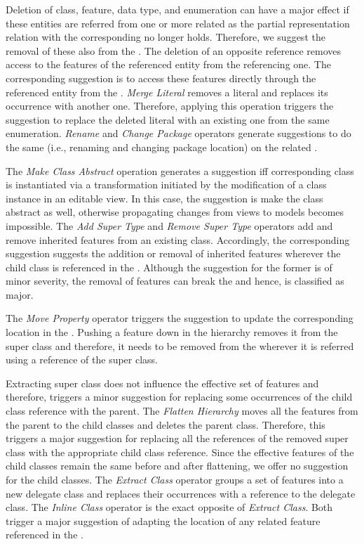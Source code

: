 Deletion of class, feature, data type, and enumeration can have a major effect if these entities are referred from one or more related \viewtypes as the partial representation relation with the corresponding \metamodel no longer holds. Therefore, we suggest the removal of these also from the \viewtypes. The deletion of an opposite reference removes access to the features of the referenced entity from the referencing one. The corresponding suggestion is to access these features directly through the referenced entity from the \viewtype. \textit{Merge Literal} removes a literal and replaces its occurrence with another one. Therefore, applying this operation triggers the suggestion to replace the deleted literal with an existing one from the same enumeration. \textit{Rename} and \textit{Change Package} operators generate suggestions to do the same (i.e., renaming and changing package location) on the related \viewtypes.

The \textit{Make Class Abstract} operation generates a suggestion iff corresponding \metamodel class is instantiated via a transformation initiated by the modification of a class instance in an editable view. In this case, the suggestion is make the \viewtype class abstract as well, otherwise propagating changes from views to models becomes impossible. The \textit{Add Super Type} and \textit{Remove Super Type} operators add and remove inherited features from an existing class. Accordingly, the corresponding suggestion suggests the addition or removal of inherited features wherever the child class is referenced in the \viewtype. Although the suggestion for the former is of minor severity, the removal of features can break the \viewtype and hence, is classified as major.

The \textit{Move Property} operator triggers the suggestion to update the corresponding location in the \viewtype. Pushing a feature down in the hierarchy removes it from the super class and therefore, it needs to be removed from the \viewtype wherever it is referred using a reference of the super class.

Extracting super class does not influence the effective set of features and therefore, triggers a minor suggestion for replacing some occurrences of the child class reference with the parent. The \textit{Flatten Hierarchy} moves all the features from the parent to the child classes and deletes the parent class. Therefore, this triggers a major suggestion for replacing all the references of the removed super class with the appropriate child class reference. Since the effective features of the child classes remain the same before and after flattening, we offer no suggestion for the child classes. The \textit{Extract Class} operator groups a set of features into a new delegate class and replaces their occurrences with a reference to the delegate class. The \textit{Inline Class} operator is the exact opposite of \textit{Extract Class}. Both trigger a major suggestion of adapting the location of any related feature referenced in the \viewtype.

